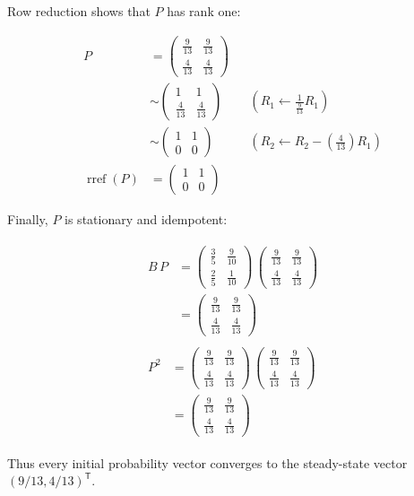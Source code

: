 \documentclass[11pt]{article}
\begin{document}
Row reduction shows that \(P\) has rank one:

\[\begin{aligned}P &= \begin{pmatrix}\frac{9}{13} & \frac{9}{13} \\ \frac{4}{13} & \frac{4}{13}\end{pmatrix} \\
&\sim \begin{pmatrix}1 & 1 \\ \frac{4}{13} & \frac{4}{13}\end{pmatrix} && \left(R_{1}\leftarrow \frac{1}{\frac{9}{13}}R_{1}\right) \\
&\sim \begin{pmatrix}1 & 1 \\ 0 & 0\end{pmatrix} && \left(R_{2}\leftarrow R_{2}-\left(\frac{4}{13}\right)R_{1}\right) \\
\operatorname{rref}\left(P\right) &= \begin{pmatrix}1 & 1 \\ 0 & 0\end{pmatrix}\end{aligned}\]

Finally, \(P\) is stationary and idempotent:

\begin{align*}\begin{aligned}B\,P &= \begin{pmatrix}\frac{3}{5} & \frac{9}{10} \\ \frac{2}{5} & \frac{1}{10}\end{pmatrix}\,\begin{pmatrix}\frac{9}{13} & \frac{9}{13} \\ \frac{4}{13} & \frac{4}{13}\end{pmatrix} \\
&= \begin{pmatrix}\frac{9}{13} & \frac{9}{13} \\ \frac{4}{13} & \frac{4}{13}\end{pmatrix}\end{aligned} \\
\begin{aligned}P^{2} &= \begin{pmatrix}\frac{9}{13} & \frac{9}{13} \\ \frac{4}{13} & \frac{4}{13}\end{pmatrix}\,\begin{pmatrix}\frac{9}{13} & \frac{9}{13} \\ \frac{4}{13} & \frac{4}{13}\end{pmatrix} \\
&= \begin{pmatrix}\frac{9}{13} & \frac{9}{13} \\ \frac{4}{13} & \frac{4}{13}\end{pmatrix}\end{aligned}\end{align*}

Thus every initial probability vector converges to the steady-state vector \((9/13,4/13)^{\mathsf T}\).
\end{document}
